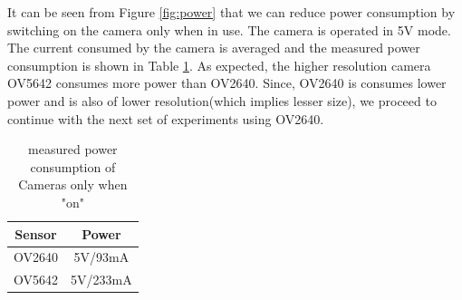  It can be seen from Figure \ref{fig:power} that we can reduce power consumption by switching on the camera only when in use. The camera is operated in 5V mode. The current consumed by the camera is averaged  and the measured power consumption is shown in Table \ref{tbl:power_cons}. As expected, the higher resolution camera OV5642 consumes more power than OV2640. Since, OV2640 is consumes lower power and is also of lower resolution(which implies lesser size), we proceed to continue with the next set of experiments using OV2640.
\begin{table}[]
\centering
\caption{measured power consumption of Cameras only when "on"}
\label{tbl:power_cons}
\begin{tabular}{|c|c|}
\hline
Sensor & Power \\
\hline
 OV2640 & 5V/93mA\\
 \hline
 OV5642 & 5V/233mA\\
 \hline
\end{tabular}
\end{table}